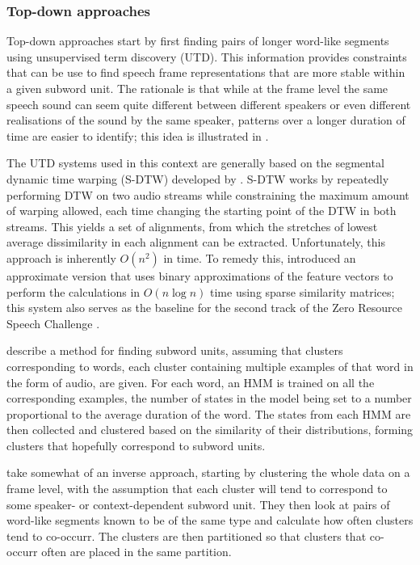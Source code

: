 \subsubsection{Top-down approaches}

Top-down approaches start by first finding pairs of longer word-like segments using unsupervised term discovery (UTD).
This information provides constraints that can be use to find speech frame representations that are more stable within a given subword unit.
The rationale is that while at the frame level the same speech sound can seem quite different between different speakers or even different realisations of the sound by the same speaker, patterns over a longer duration of time are easier to identify; this idea is illustrated in \textcite{jansen2013weak}.

The UTD systems used in this context are generally based on the segmental dynamic time warping (S-DTW) developed by \textcite{park2008unsupervised}.
S-DTW works by repeatedly performing DTW on two audio streams while constraining the maximum amount of warping allowed, each time changing the starting point of the DTW in both streams.
This yields a set of alignments, from which the stretches of lowest average dissimilarity in each alignment can be extracted.
Unfortunately, this approach is inherently $O(n^2)$ in time.
To remedy this, \textcite{jansen2011efficient} introduced an approximate version that uses binary approximations of the feature vectors to perform the calculations in $O(n \log n)$ time using sparse similarity matrices; this system also serves as the baseline for the second track of the Zero Resource Speech Challenge \parencite{versteegh2015zero}.

\textcite{jansen2011towards} describe a method for finding subword units, assuming that clusters corresponding to words, each cluster containing multiple examples of that word in the form of audio, are given.
For each word, an HMM is trained on all the corresponding examples, the number of states in the model being set to a number proportional to the average duration of the word.
The states from each HMM are then collected and clustered based on the similarity of their distributions, forming clusters that hopefully correspond to subword units.

\textcite{jansen2013weak} take somewhat of an inverse approach, starting by clustering the whole data on a frame level, with the assumption that each cluster will tend to correspond to some speaker- or context-dependent subword unit.
They then look at pairs of word-like segments known to be of the same type and calculate how often clusters tend to co-occurr.
The clusters are then partitioned so that clusters that co-occurr often are placed in the same partition.

